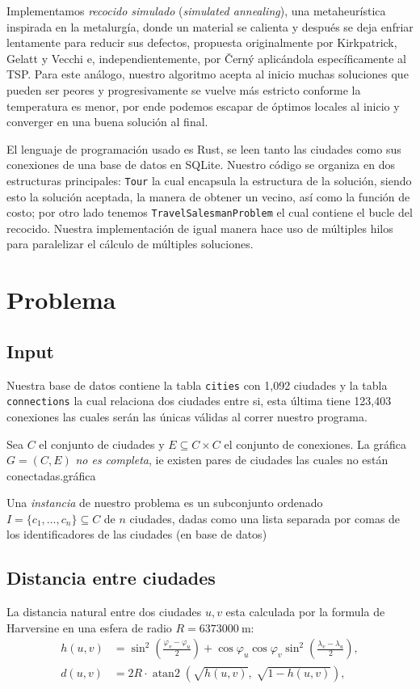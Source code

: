 \documentclass[11pt,letterpaper]{article}
\begin{document}
Implementamos \emph{recocido simulado} (\emph{simulated annealing}), una metaheurística inspirada en la metalurgía, donde un material se calienta y después se deja enfriar lentamente para reducir sus defectos, propuesta originalmente por Kirkpatrick, Gelatt y Vecchi \cite{kirkpatrick1983} e, independientemente, por Černý \cite{cerny1985} aplicándola específicamente al TSP. Para este análogo, nuestro algoritmo acepta al inicio muchas soluciones que pueden ser peores y progresivamente se vuelve más estricto conforme la temperatura es menor, por ende podemos escapar de óptimos locales al inicio y converger en una buena solución al final.

El lenguaje de programación usado es Rust, se leen tanto las ciudades como sus conexiones de una base de datos en SQLite. Nuestro código se organiza en dos estructuras principales: \texttt{Tour} la cual encapsula la estructura de la solución, siendo esto la solución aceptada, la manera de obtener un vecino, así como la función de costo; por otro lado tenemos \texttt{TravelSalesmanProblem} el cual contiene el bucle del recocido. Nuestra implementación de igual manera hace uso de múltiples hilos para paralelizar el cálculo de múltiples soluciones.

\section{Problema}
\label{sec:problem}

\subsection{Input}
Nuestra base de datos contiene la tabla \texttt{cities} con 1,092 ciudades y la tabla \texttt{connections} la cual relaciona dos ciudades entre si, esta última tiene 123,403 conexiones las cuales serán las únicas válidas al correr nuestro programa.

Sea $C$ el conjunto de ciudades y $E \subseteq C \times C$ el conjunto de conexiones. La gráfica $G = (C,E)$ \emph{no es completa}, ie existen pares de ciudades las cuales no están conectadas.gráfica

Una \emph{instancia} de nuestro problema es un subconjunto ordenado $I = \{c_1, \dots, c_n\} \subseteq C$ de $n$ ciudades, dadas como una lista separada por comas de los identificadores de las ciudades (en base de datos)

\subsection{Distancia entre ciudades}
La distancia natural entre dos ciudades $u,v$ esta calculada por la formula de Harversine en una esfera de radio $R = \SI{6373000}{\metre}$:
\begin{align}
  h(u, v) &= \sin^2\!\left(\tfrac{\varphi_v - \varphi_u}{2}\right)
           + \cos\varphi_u \cos\varphi_v
             \sin^2\!\left(\tfrac{\lambda_v - \lambda_u}{2}\right), \\
  d(u, v) &= 2R \cdot \operatorname{atan2}\!\left(\sqrt{h(u,v)},\;
             \sqrt{1 - h(u,v)}\right),
\end{align}
\end{document}
